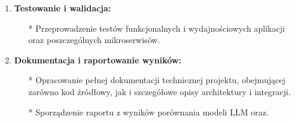 \begin{enumerate}
    \item {\bf Testowanie i walidacja:}
        \begin{itemize}
            \item[*] Przeprowadzenie testów funkcjonalnych i wydajnościowych aplikacji oraz poszczególnych mikroserwisów.
       \end{itemize}
    
    \item {\bf Dokumentacja i raportowanie wyników:}
        \begin{itemize}
            \item[*] Opracowanie pełnej dokumentacji technicznej projektu, obejmującej zarówno kod źródłowy, jak i szczegółowe opisy architektury i integracji.
            \item[*] Sporządzenie raportu z wyników porównania modeli LLM oraz.
       \end{itemize}

\end{enumerate}


